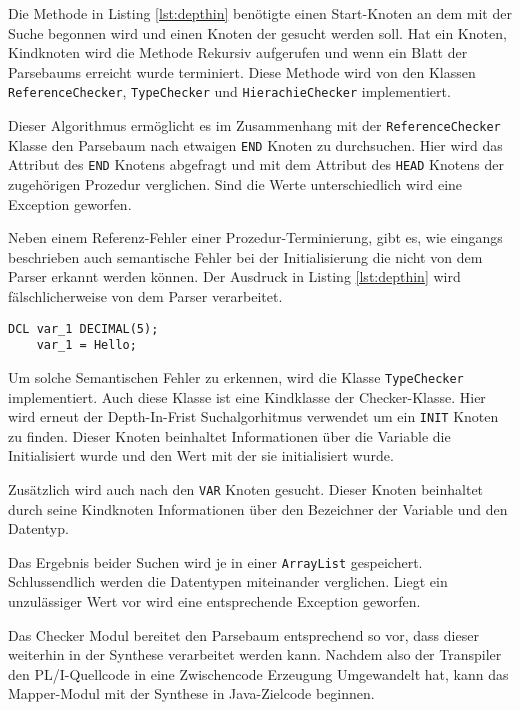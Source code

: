 Die Methode in Listing \ref{lst:depthin} benötigte einen Start-Knoten an dem mit der Suche begonnen wird und einen Knoten der gesucht werden soll.
Hat ein Knoten, Kindknoten wird die Methode Rekursiv aufgerufen und  wenn ein Blatt der Parsebaums erreicht wurde terminiert.
Diese Methode wird von den Klassen \verb+ReferenceChecker+, \verb+TypeChecker+ und \verb+HierachieChecker+ implementiert.

Dieser Algorithmus ermöglicht es im Zusammenhang mit der \verb+ReferenceChecker+ Klasse den Parsebaum nach etwaigen \verb+END+ Knoten zu durchsuchen.
Hier wird das Attribut des \verb+END+ Knotens abgefragt und mit dem Attribut des \verb+HEAD+ Knotens der zugehörigen Prozedur verglichen. Sind die Werte unterschiedlich wird eine Exception geworfen.

Neben einem Referenz-Fehler einer Prozedur-Terminierung, gibt es, wie eingangs beschrieben auch semantische Fehler bei der Initialisierung die nicht von dem Parser erkannt werden können.
Der Ausdruck in Listing \ref{lst:depthin} wird fälschlicherweise von dem Parser verarbeitet.

\begin{lstlisting}[language=PL/I, caption=Deklaration einer Varibale des Typs Decimal, label={lst:decimal}]
	DCL var_1 DECIMAL(5);
	var_1 = Hello;
\end{lstlisting}


Um solche Semantischen Fehler zu erkennen, wird die Klasse \verb+TypeChecker+ implementiert. 
Auch diese Klasse ist eine Kindklasse der Checker-Klasse. Hier wird erneut der Depth-In-Frist Suchalgorhitmus verwendet um ein \verb+INIT+ Knoten zu finden. Dieser Knoten beinhaltet Informationen über die Variable die Initialisiert wurde und den Wert mit der sie initialisiert wurde.
 
Zusätzlich wird auch nach den \verb+VAR+ Knoten gesucht. Dieser Knoten beinhaltet durch seine Kindknoten Informationen über den Bezeichner der Variable und den Datentyp.

Das Ergebnis beider Suchen wird je in einer \verb+ArrayList+ gespeichert. Schlussendlich werden die Datentypen miteinander verglichen. Liegt ein unzulässiger Wert vor wird eine entsprechende Exception geworfen.

Das Checker Modul bereitet den Parsebaum entsprechend so vor, dass dieser weiterhin in der Synthese verarbeitet werden kann.
Nachdem also der Transpiler den PL/I-Quellcode in eine Zwischencode Erzeugung Umgewandelt hat, kann das Mapper-Modul mit der Synthese in Java-Zielcode beginnen.
 
